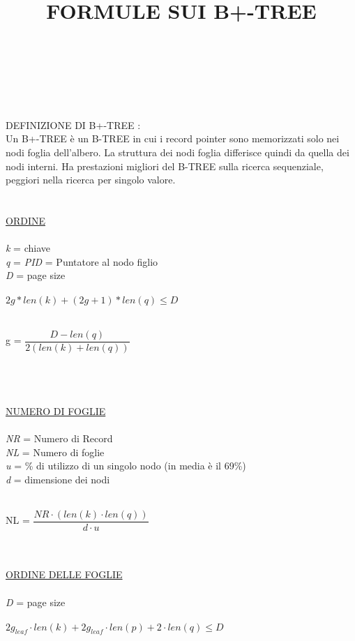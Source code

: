 \documentclass[a4paper,12pt]{article}
\begin{document}
	\begin{titlepage}
	\title{{\huge \textbf{FORMULE SUI B+-TREE}}}
	\maketitle\\\\
	\\\\
	DEFINIZIONE DI B+-TREE :	\\
	Un B+-TREE è un B-TREE in cui i record pointer sono memorizzati solo nei nodi foglia dell'albero. La struttura dei nodi foglia differisce quindi da quella dei nodi interni. 
	Ha prestazioni migliori del B-TREE sulla ricerca sequenziale, peggiori nella ricerca per singolo valore. \\ \\ \\
	\underline{ORDINE} \\ \\
	\textit{k} = chiave \\
	\textit{q} = \textit{PID} = Puntatore al nodo figlio \\
	\textit{D} = page size \\ \\
	${2g*len(k) + (2g+1)*len(q) \leq D}$ \\ \\
	\centerline{{\Large g = ${\dfrac{D - len(q)}{2(len(k) + len(q))}}$}} \\ \\ \\
	\underline{NUMERO DI FOGLIE} \\ \\
	\textit{NR} = Numero di Record \\
	\textit{NL} = Numero di foglie \\
	\textit{u} = \% di utilizzo di un singolo nodo (in media è il 69\%) \\
	\textit{d} = dimensione dei nodi \\ \\
	\centerline{{\Large NL = ${\dfrac{NR \cdot (len(k) \cdot len(q))}{d \cdot u}}$}} \\ \\
	\underline{ORDINE DELLE FOGLIE} \\ \\
	\textit{D} = page size \\ \\
	${2g_{leaf} \cdot len(k) + 2g_{leaf} \cdot len(p) + 2 \cdot len(q) \leq D}$ \\ \\

\end{titlepage}
\end{document}
